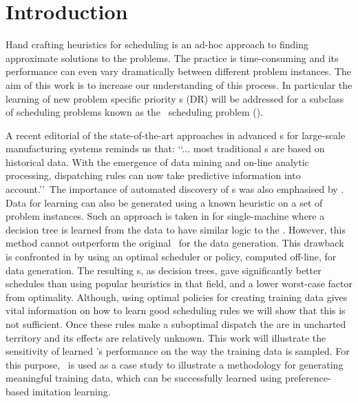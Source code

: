 \documentclass[smallextended]{svjour3}
\begin{document}

\section{Introduction}\label{sec:introduction}

Hand crafting heuristics for scheduling is an ad-hoc approach to finding 
approximate solutions to the problems. The practice is time-consuming and its 
performance can even vary dramatically between different problem instances. The 
aim of this work is to increase our understanding of this process. In 
particular the learning of new problem specific priority \dr s (DR) will be 
addressed for a subclass of scheduling problems known as the \jsp\ scheduling 
problem (\JSP). 

A recent editorial of the state-of-the-art approaches \cite{Chen13} in advanced 
\dr s for large-scale manufacturing systems reminds us that:
\lq\lq ... most traditional \dr s are based on historical data. 
With the emergence of data mining and on-line analytic processing, dispatching 
rules can now take predictive information into account.\rq\rq~The importance of 
automated discovery of \dr s was also emphasised by \cite{Monch13}. 
Data for learning can also be generated using a known heuristic on a set of 
problem instances.
Such an approach is taken in \cite{Siggi05} for single-machine where
a decision tree is learned from the data to have similar logic to the \dr.  
However, this method cannot outperform the original \dr\ for the data generation. 
This drawback is confronted in \cite{Malik08,Russell09,Siggi10} by using an 
optimal scheduler or policy, computed off-line, for data generation. The 
resulting \dr s, as decision trees, gave significantly better schedules than using popular 
heuristics in that field, and a lower worst-case factor from optimality. 
Although, using optimal policies for creating training data gives vital 
information on how to learn good scheduling rules we will show that this is 
not sufficient. Once these rules make a suboptimal dispatch the are in uncharted 
territory and its effects are relatively unknown.  
This work will illustrate the sensitivity of learned \dr's performance on the 
way 
the training data is sampled.
For this purpose, \JSP\ is used as a case study to illustrate a methodology for 
generating meaningful training data, which can be successfully 
learned using preference-based imitation learning.
\end{document}
